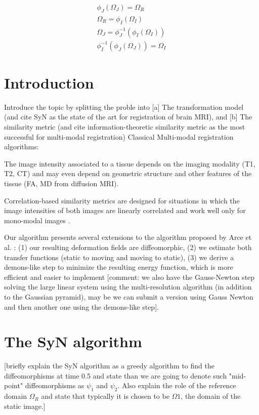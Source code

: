 \begin{align}
    \phi_{J}(\Omega_{J}) = \Omega_{R}\\
    \Omega_{R} = \phi_{I}(\Omega_{I})\\
    \Omega_{J} = \phi_{J}^{-1}(\phi_{I}(\Omega_{I}))\\
    \phi_{I}^{-1}(\phi_{J}(\Omega_{J})) = \Omega_{I}
\end{align}


\section{Introduction}
Introduce the topic by splitting the proble into [a] The transformation model (and cite SyN as the state of the art for registration of brain MRI), and [b] The similarity metric (and cite information-theoretic similarity metric as the most successful for multi-modal registration)
Classical Multi-modal registration algorithms: \cite{Wells1996}\cite{Maes1997}

The image intensity associated to a tissue depends on the imaging modality (T1, T2, CT) and may even depend on geometric structure and other features of the tissue (FA, MD from diffusion MRI).


Correlation-based similarity metrics are designed for situations in which the image intensities of both images are linearly correlated and work well only for mono-modal images \cite{Roche2004}.

Our algorithm presents several extensions to the algorithm proposed by Arce et al. \cite{Arce-santana2014}: (1) our resulting deformation fields are diffeomorphic, (2) we estimate both transfer functions (static to moving and moving to static), (3) we derive a demons-like step to minimize the resulting energy function, which is more efficient and easier to implement [comment: we also have the Gauss-Newton step solving the large linear system using the multi-resolution algorithm (in addition to the Gaussian pyramid), may be we can submit a version using Gauss Newton and then another one using the demons-like step].

\section{The SyN algorithm}
[briefly explain the SyN algorithm as a greedy algorithm to find the diffeomorphisms at time 0.5 and state than we are going to denote such "mid-point" diffeomorphisms as $\psi_{1}$ and $\psi_{2}$. Also explain the role of the reference domain $\Omega_R$ and state that typically it is chosen to be $\Omega{1}$, the domain of the static image.]


